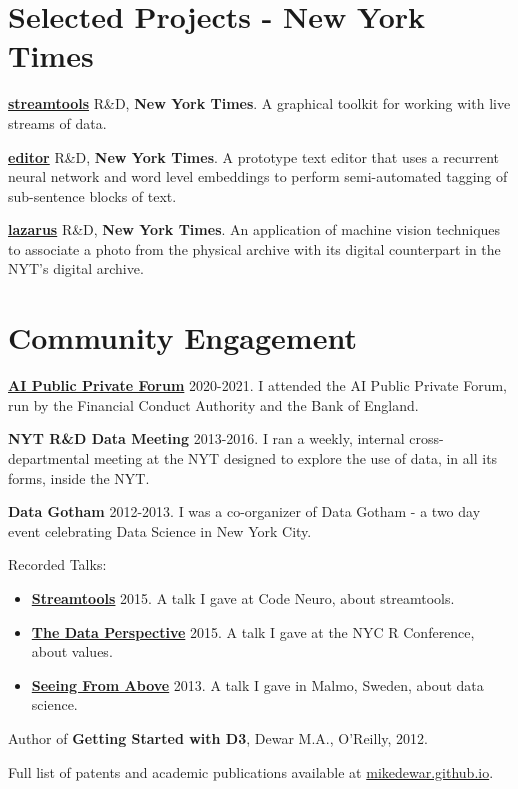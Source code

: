 \documentclass[line, overlapped]{res}
\providecommand{\tightlist}{%
  \setlength{\itemsep}{0pt}\setlength{\parskip}{0pt}}
\begin{document}
\begin{resume}
\section{Selected Projects - New York Times}
	\href{https://github.com/nytlabs/streamtools}{\textbf{streamtools}} R\&D, \textbf{New York Times}. A graphical toolkit for working with live streams of data.

	\href{http://nytlabs.com/projects/editor.html}{\textbf{editor}} R\&D, \textbf{New York Times}. A prototype text editor that uses a recurrent neural network and word level embeddings to perform semi-automated tagging of sub-sentence blocks of text.

	\href{http://nytlabs.com/projects/lazarus.html}{\textbf{lazarus}} R\&D, \textbf{New York Times}. An application of machine vision techniques to associate a photo from the physical archive with its digital counterpart in the NYT's digital archive.

\section{Community Engagement}

	\href{https://www.bankofengland.co.uk/research/fintech/ai-public-private-forum}{\textbf{AI Public Private Forum}} 2020-2021. I attended the AI Public
  Private Forum, run by the Financial Conduct Authority and the Bank of
  England.

  \textbf{NYT R\&D Data Meeting} 2013-2016. I ran a weekly, internal
  cross-departmental meeting at the NYT designed to explore the use of
  data, in all its forms, inside the NYT.

  \textbf{Data Gotham} 2012-2013. I was a co-organizer of Data Gotham -
  a two day event celebrating Data Science in New York City.

  Recorded Talks:
  \begin{itemize}
  \tightlist
	  \item \href{https://www.youtube.com/watch?v=23FgdEHOt0w}{\textbf{Streamtools}} 2015. A talk  I gave at Code Neuro, about streamtools.

	  \item \href{https://www.youtube.com/watch?v=Jsg4R9z\_Z7M}{\textbf{The Data Perspective}} 2015. A talk I gave at the NYC R Conference, about values.

	  \item \href{http://videos.theconference.se/mike-dewar-big-data-understand-and}{\textbf{Seeing From Above}} 2013. A talk I gave in Malmo, Sweden, about data science.

  \end{itemize}

  Author of \textbf{Getting Started with D3}, Dewar M.A., O'Reilly,
  2012.

  Full list of patents and academic publications available at \href{https://mikedewar.github.io}{mikedewar.github.io}.

\end{resume}
\end{document}
